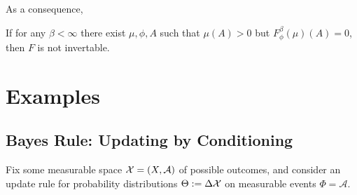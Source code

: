 \documentclass{article}
\begin{document}


As a consequence,
\begin{coro}
    If for any $\beta < \infty$ there exist $\mu, \phi, A$ such that
    $\mu(A) > 0$  but $F^{\beta}_\phi(\mu)(A) = 0$, then $F$ is not invertable.
\end{coro}


%



\section{Examples}


\subsection{Bayes Rule: Updating by Conditioning}
Fix some measurable space $\mathcal X = (X, \mathcal A)$ of possible outcomes, and consider an update rule for probability distributions $\Theta := \Delta\mathcal X$
on measurable events $\Phi = \mathcal A$.
\end{document}
